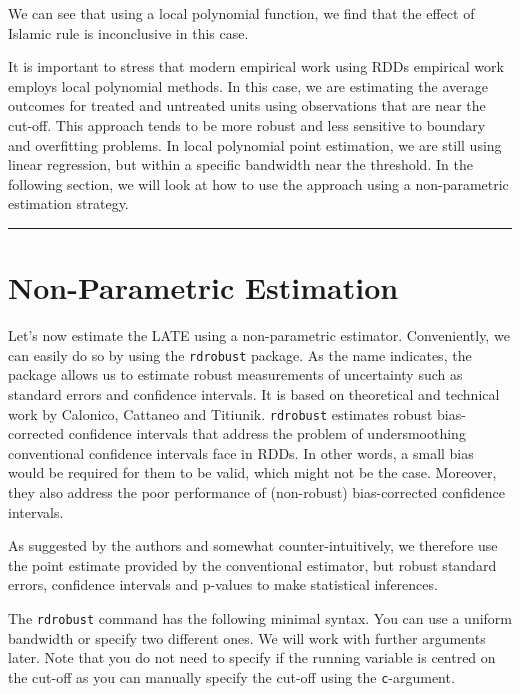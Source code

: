 \documentclass[
  letterpaper,
  DIV=11,
  numbers=noendperiod]{scrreprt}
\begin{document}
We can see that using a local polynomial function, we find that the
effect of Islamic rule is inconclusive in this case.

\hfill\break

It is important to stress that modern empirical work using RDDs
empirical work employs local polynomial methods. In this case, we are
estimating the average outcomes for treated and untreated units using
observations that are near the cut-off. This approach tends to be more
robust and less sensitive to boundary and overfitting problems. In local
polynomial point estimation, we are still using linear regression, but
within a specific bandwidth near the threshold. In the following
section, we will look at how to use the approach using a non-parametric
estimation strategy.

\begin{center}\rule{0.5\linewidth}{0.5pt}\end{center}

\hypertarget{non-parametric-estimation}{%
\section{Non-Parametric Estimation}\label{non-parametric-estimation}}

Let's now estimate the LATE using a non-parametric estimator.
Conveniently, we can easily do so by using the \texttt{rdrobust}
package. As the name indicates, the package allows us to estimate robust
measurements of uncertainty such as standard errors and confidence
intervals. It is based on theoretical and technical work by Calonico,
Cattaneo and Titiunik. \texttt{rdrobust} estimates robust bias-corrected
confidence intervals that address the problem of undersmoothing
conventional confidence intervals face in RDDs. In other words, a small
bias would be required for them to be valid, which might not be the
case. Moreover, they also address the poor performance of (non-robust)
bias-corrected confidence intervals.

As suggested by the authors and somewhat counter-intuitively, we
therefore use the point estimate provided by the conventional estimator,
but robust standard errors, confidence intervals and p-values to make
statistical inferences.

The \texttt{rdrobust} command has the following minimal syntax. You can
use a uniform bandwidth or specify two different ones. We will work with
further arguments later. Note that you do not need to specify if the
running variable is centred on the cut-off as you can manually specify
the cut-off using the \texttt{c}-argument.
\end{document}
